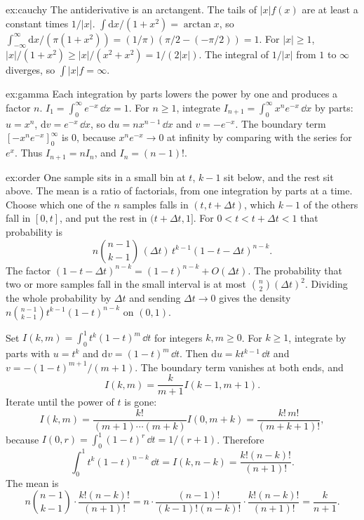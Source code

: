 \begin{solution}{ex:cauchy}
\idea The antiderivative is an arctangent. The tails of $|x|f(x)$ are at least a constant times $1/|x|$.
\writeup $\int \mathrm dx/(1+x^2)=\arctan x$, so $\int_{-\infty}^{\infty}\mathrm dx/(\pi(1+x^2))=(1/\pi)(\pi/2-(-\pi/2))=1$. For $|x|\ge1$, $|x|/(1+x^2)\ge |x|/(x^2+x^2)=1/(2|x|)$. The integral of $1/|x|$ from $1$ to $\infty$ diverges, so $\int |x|f=\infty$.
\end{solution}

\begin{solution}{ex:gamma}
\idea Each integration by parts lowers the power by one and produces a factor $n$.
\writeup $I_1=\int_0^{\infty}e^{-x}\,\dd x=1$. For $n\ge1$, integrate $I_{n+1}=\int_0^{\infty}x^n e^{-x}\,\dd x$ by parts: $u=x^n$, $\mathrm dv=e^{-x}\,\dd x$, so $\mathrm du=nx^{n-1}\,\dd x$ and $v=-e^{-x}$. The boundary term $[-x^n e^{-x}]_0^{\infty}$ is $0$, because $x^n e^{-x}\to0$ at infinity by comparing with the series for $e^{x}$. Thus $I_{n+1}=n I_n$, and $I_n=(n-1)!$.
\end{solution}

\begin{solution}{ex:order}
\idea One sample sits in a small bin at $t$, $k-1$ sit below, and the rest sit above. The mean is a ratio of factorials, from one integration by parts at a time.
\writeup Choose which one of the $n$ samples falls in $(t,t+\Delta t)$, which $k-1$ of the others fall in $[0,t]$, and put the rest in $(t+\Delta t,1]$. For $0<t<t+\Delta t<1$ that probability is
\[
 n\binom{n-1}{k-1}\,(\Delta t)\,t^{k-1}(1-t-\Delta t)^{n-k}.
\]
The factor $(1-t-\Delta t)^{n-k}=(1-t)^{n-k}+O(\Delta t)$. The probability that two or more samples fall in the small interval is at most $\binom{n}{2}(\Delta t)^2$. Dividing the whole probability by $\Delta t$ and sending $\Delta t\to0$ gives the density $n\binom{n-1}{k-1}t^{k-1}(1-t)^{n-k}$ on $(0,1)$.

Set $I(k,m)=\int_0^1 t^k(1-t)^m\,\dd t$ for integers $k,m\ge0$. For $k\ge1$, integrate by parts with $u=t^k$ and $\mathrm dv=(1-t)^m\,\dd t$. Then $\mathrm du=kt^{k-1}\,\dd t$ and $v=-(1-t)^{m+1}/(m+1)$. The boundary term vanishes at both ends, and
\[
 I(k,m)=\frac{k}{m+1}I(k-1,m+1).
\]
Iterate until the power of $t$ is gone:
\[
 I(k,m)=\frac{k!}{(m+1)\cdots(m+k)}I(0,m+k)=\frac{k!\,m!}{(m+k+1)!},
\]
because $I(0,r)=\int_0^1(1-t)^r\,\dd t=1/(r+1)$. Therefore
\[
 \int_0^1 t^{k}(1-t)^{n-k}\,\dd t=I(k,n-k)=\frac{k!(n-k)!}{(n+1)!}.
\]
The mean is
\[
 n\binom{n-1}{k-1}\cdot\frac{k!(n-k)!}{(n+1)!}
 =n\cdot\frac{(n-1)!}{(k-1)!(n-k)!}\cdot\frac{k!(n-k)!}{(n+1)!}
 =\frac{k}{n+1}.
\]
\end{solution}


